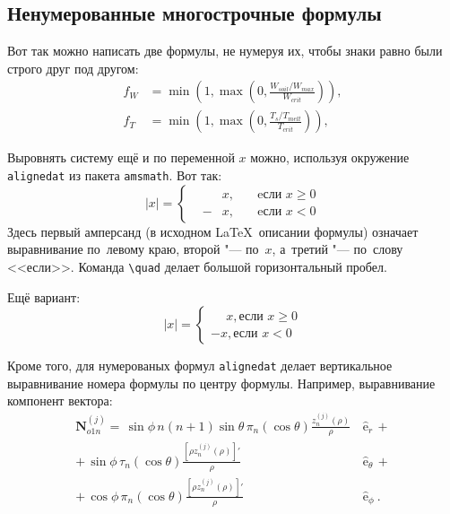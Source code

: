 \subsection{Ненумерованные многострочные формулы} \label{subsect1_3_2}

Вот так можно написать две формулы, не нумеруя их, чтобы знаки равно были строго друг под другом:
\begin{align}
  f_W & =  \min \left( 1, \max \left( 0, \frac{W_{soil} / W_{max}}{W_{crit}} \right)  \right), \nonumber \\
  f_T & =  \min \left( 1, \max \left( 0, \frac{T_s / T_{melt}}{T_{crit}} \right)  \right), \nonumber
\end{align}

Выровнять систему ещё и по переменной $ x $ можно, используя окружение \verb|alignedat| из пакета \verb|amsmath|. Вот так:
\[
    |x| = \left\{
    \begin{alignedat}{2}
        &&x, \quad &\text{eсли } x\geqslant 0 \\
        &-&x, \quad & \text{eсли } x<0
    \end{alignedat}
    \right.
\]
Здесь первый амперсанд (в исходном \LaTeX\ описании формулы) означает выравнивание по~левому краю,
второй "--- по~$ x $, а~третий "--- по~слову <<если>>. Команда \verb|\quad| делает большой горизонтальный пробел.

Ещё вариант:
\[
    |x|=
    \begin{cases}
    \phantom{-}x, \text{если } x \geqslant 0 \\
    -x, \text{если } x<0
    \end{cases}
\]

Кроме того, для  нумерованых формул \verb|alignedat|  делает вертикальное
выравнивание номера формулы по центру формулы. Например,  выравнивание компонент вектора:
\begin{equation}
 \label{eq:2p3}
 \begin{alignedat}{2}
{\mathbf{N}}_{o1n}^{(j)} = \,{\sin} \phi\,n\!\left(n+1\right)
         {\sin}\theta\,
         \pi_n\!\left({\cos} \theta\right)
         \frac{
               z_n^{(j)}\!\left( \rho \right)
              }{\rho}\,
           &{\boldsymbol{\hat{\mathrm e}}}_{r}\,+   \\
+\,
{\sin} \phi\,
         \tau_n\!\left({\cos} \theta\right)
         \frac{
            \left[\rho z_n^{(j)}\!\left( \rho \right)\right]'
              }{\rho}\,
            &{\boldsymbol{\hat{\mathrm e}}}_{\theta}\,+   \\
+\,
{\cos} \phi\,
         \pi_n\!\left({\cos} \theta\right)
         \frac{
            \left[\rho z_n^{(j)}\!\left( \rho \right)\right]'
              }{\rho}\,
            &{\boldsymbol{\hat{\mathrm e}}}_{\phi}\:.
\end{alignedat}
\end{equation}


